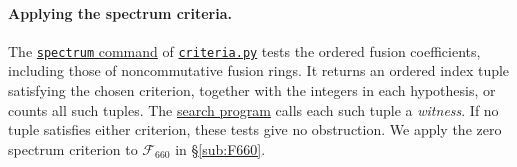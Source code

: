 \documentclass{amsart}
\begin{document}
\paragraph{Applying the spectrum criteria.}
The \href{https://github.com/sebastienpalcoux/triangular-prism-categorification/blob/f816c697fde088b261e1fe1ce703980e5dbdab51/criteria.py#L18-L25}{\texttt{spectrum} command} of \href{https://github.com/sebastienpalcoux/triangular-prism-categorification/blob/f816c697fde088b261e1fe1ce703980e5dbdab51/criteria.py}{\texttt{criteria.py}} tests the ordered fusion coefficients, including those of noncommutative fusion rings. It returns an ordered index tuple satisfying the chosen criterion, together with the integers in each hypothesis, or counts all such tuples. The \href{https://github.com/sebastienpalcoux/triangular-prism-categorification/blob/f816c697fde088b261e1fe1ce703980e5dbdab51/spectrum.py}{search program} calls each such tuple a \emph{witness}. If no tuple satisfies either criterion, these tests give no obstruction. We apply the zero spectrum criterion to $\mathcal F_{660}$ in \S\ref{sub:F660}.
\end{document}
